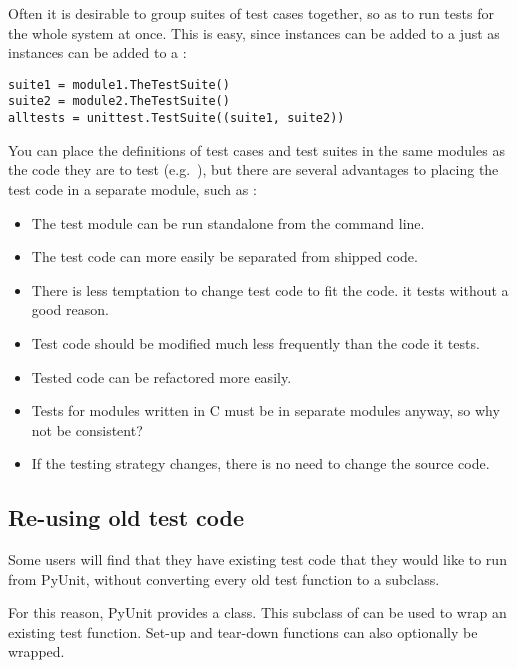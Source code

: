 Often it is desirable to group suites of test cases together, so as to
run tests for the whole system at once.  This is easy, since
 instances can be added to a  just
as  instances can be added to a :

\begin{verbatim}
suite1 = module1.TheTestSuite()
suite2 = module2.TheTestSuite()
alltests = unittest.TestSuite((suite1, suite2))
\end{verbatim}

You can place the definitions of test cases and test suites in the
same modules as the code they are to test (e.g.\ ),
but there are several advantages to placing the test code in a
separate module, such as :

\begin{itemize}
  \item The test module can be run standalone from the command line.
  \item The test code can more easily be separated from shipped code.
  \item There is less temptation to change test code to fit the code.
        it tests without a good reason.
  \item Test code should be modified much less frequently than the
        code it tests.
  \item Tested code can be refactored more easily.
  \item Tests for modules written in C must be in separate modules
        anyway, so why not be consistent?
  \item If the testing strategy changes, there is no need to change
        the source code.
\end{itemize}


\subsection{Re-using old test code
            \label{legacy-unit-tests}}

Some users will find that they have existing test code that they would
like to run from PyUnit, without converting every old test function to
a  subclass.

For this reason, PyUnit provides a  class.
This subclass of  can be used to wrap an existing test
function.  Set-up and tear-down functions can also optionally be
wrapped.

